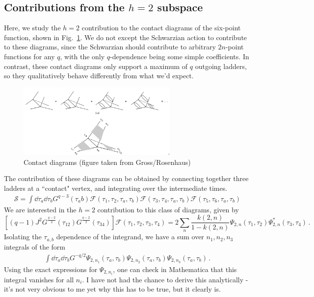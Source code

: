 \documentclass[aps,prx,preprint,onecolumn,citeautoscript,footinbib]{revtex4-1}
\begin{document}
\subsection{Contributions from the $h=2$ subspace}
Here, we study the $h=2$ contribution to the contact diagrams of the six-point function, shown in Fig.~\ref{fig:contact}. We do not except the Schwarzian action to contribute to these diagrams, since the Schwarzian should contribute to arbitrary $2n$-point functions for any $q$, with the only $q$-dependence being some simple coefficients. In contrast, these contact diagrams only support a maximum of $q$ outgoing ladders, so they qualitatively behave differently from what we'd expect.
\begin{figure}
    \centering
    \includegraphics[width=0.7\textwidth]{contact.png}
    \caption{Contact diagrams (figure taken from Gross/Rosenhaus)}
    \label{fig:contact}
\end{figure}
The contribution of these diagrams can be obtained by connecting together three ladders at a ``contact" vertex, and integrating over the intermediate times. 
\begin{equation}
    \begin{aligned}
        \mathcal{S} = \int \dd{\tau_a} \dd{\tau_b} G^{q-3}(\tau_ab) \mathcal{F}(\tau_1, \tau_2, \tau_a, \tau_b)\mathcal{F}(\tau_3, \tau_4, \tau_a, \tau_b)\mathcal{F}(\tau_5, \tau_6, \tau_a, \tau_b)
    \end{aligned}
\end{equation}
We are interested in the $h=2$ contribution to this class of diagrams, given by
\begin{equation}
 \left[(q-1) J^2 G^{\frac{q-2}{2}}(\tau_{12})  G^{\frac{q-2}{2}}(\tau_{34})\right] \mathcal{F}(\tau_1, \tau_2, \tau_3, \tau_4) = 2 \sum_n \frac{k(2, n)}{1-k(2, n)} \Psi_{2, n}(\tau_1, \tau_2) \Psi_{2, n}^*(\tau_3, \tau_4)\,.
 \label{eq:softModeFourPoint}
\end{equation}
Isolating the $\tau_{a,b}$ dependence of the integrand, we have a sum over $n_1, n_2, n_3$ integrals of the form
\begin{equation}
    \begin{aligned}
         \int \dd{\tau_a} \dd{\tau_b} G^{-q/2} \Psi_{2, n_1}(\tau_a, \tau_b) \Psi_{2, n_2}(\tau_a, \tau_b) \Psi_{2, n_3}(\tau_a, \tau_b)\,.
         \label{eq:contactIntegral}
    \end{aligned}
\end{equation}
Using the exact expressions for $\Psi_{2, n_i}$, one can check in Mathematica that this integral vanishes for all $n_i$. I have not had the chance to derive this analytically - it's not very obvious to me yet why this has to be true, but it clearly is.
\end{document}
